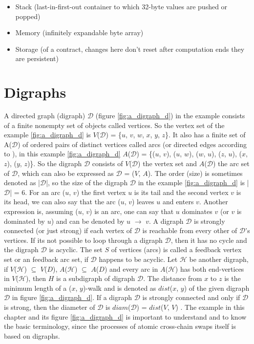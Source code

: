\begin{itemize}
	\item Stack (last-in-first-out container to which 32-byte values are pushed or popped)
	\item Memory (infinitely expandable byte array)
	\item Storage (of a contract, changes here don't reset after computation ends they are persistent)
\end{itemize}


\clearpage


\section{Digraphs}
\label{sec:background:second_section}
A directed graph (digraph) $\mathcal{D}$ (figure \ref{fig:a_digraph_d}) in the example consists of a finite nonempty set of objects called vertices. So the vertex set of the example \ref{fig:a_digraph_d} is $V$($\mathcal{D}$) = \{$u$, $v$, $w$, $x$, $y$, $z$\}. It also has a finite set of A($\mathcal{D}$) of ordered pairs of distinct vertices called arcs (or directed edges according to \cite{chartrand2010graphs}), in this example \ref{fig:a_digraph_d} $A$($\mathcal{D}$) = \{($u$, $v$), ($u$, $w$), ($w$, $u$), ($z$, $u$), ($x$, $z$), ($y$, $z$)\}. So the digraph $\mathcal{D}$ consists of $V$($\mathcal{D}$) the vertex set and $A$($\mathcal{D}$) the arc set of $\mathcal{D}$, which can also be expressed as $\mathcal{D}$ = ($V$, $A$). The order (size) is sometimes denoted as |$\mathcal{D}$|, so the size of the digraph $\mathcal{D}$ in the example \ref{fig:a_digraph_d} is |$\mathcal{D}$| = 6. For an arc ($u$, $v$) the first vertex $u$ is its tail and the second vertex $v$ is its head, we can also say that the arc ($u$, $v$) leaves $u$ and enters $v$. Another expression is, assuming ($u$, $v$) is an arc, one can say that $u$ dominates $v$ (or $v$ is dominated by $u$) and can be denoted by $u$ $\rightarrow$ $v$. A digraph $\mathcal{D}$ is strongly connected (or just strong) if each vertex of $\mathcal{D}$ is reachable from every other of $\mathcal{D}$'s vertices.  If its not possible to loop through a digraph $\mathcal{D}$, then it has no cycle and the digraph $\mathcal{D}$ is acyclic. The set $S$ of vertices (arcs) is called a feedback vertex set or an feedback arc set, if $\mathcal{D}$ happens to be acyclic. Let $\mathcal{H}$ be another digraph, if $V$($\mathcal{H}$) $\subseteq$ $V$($D$), $A$($\mathcal{H}$) $\subseteq$ $A$($D$) and every arc in $A$($\mathcal{H}$) has both end-vertices in $V$($\mathcal{H}$), then $H$ is a subdigraph of digraph $\mathcal{D}$. The distance from $x$ to $z$ is the minimum length of a ($x$, $y$)-walk and is denoted as $dist$($x$, $y$) of the given digraph $\mathcal{D}$ in figure \ref{fig:a_digraph_d}. If a digraph $\mathcal{D}$ is strongly connected and only if $\mathcal{D}$ is strong, then the diameter of $\mathcal{D}$ is $diam$($\mathcal{D}$) = $dist$($V$, $V$) \cite{bang2007theory}. The example in this chapter and its figure \ref{fig:a_digraph_d} is important to understand and to know the basic terminology, since the processes of atomic cross-chain swaps itself is based on digraphs.


